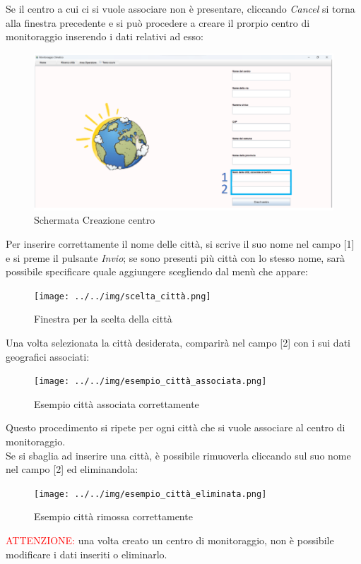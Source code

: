 Se il centro a cui ci si vuole associare non è presentare, cliccando \emph{Cancel} si torna alla finestra precedente e si può procedere a creare il prorpio
centro di monitoraggio inserendo i dati relativi ad esso:
\begin{figure}[H]
    \centering
    \includegraphics[width=1\textwidth]{../../img/schermata_creazione_centro.png}
    \caption{Schermata Creazione centro}
\end{figure}

Per inserire correttamente il nome delle città, si scrive il suo nome nel campo [1] e si preme il pulsante \emph{Invio}; se sono presenti più città
con lo stesso nome,
sarà possibile specificare quale aggiungere scegliendo dal menù che appare: 
\begin{figure}[H]
    \centering
    \texttt{[image: ../../img/scelta\_città.png]}
    \caption{Finestra per la scelta della città}
\end{figure}

Una volta selezionata la città desiderata, comparirà nel campo [2] con i sui dati geografici associati:
\begin{figure}[H]
    \centering
    \texttt{[image: ../../img/esempio\_città\_associata.png]}
    \caption{Esempio città associata correttamente}
\end{figure}

Questo procedimento si ripete per ogni città che si vuole associare al centro di monitoraggio.\\
Se si sbaglia ad inserire una città, è possibile rimuoverla cliccando sul suo nome nel campo [2] ed eliminandola:
\begin{figure}[H]
    \centering
    \texttt{[image: ../../img/esempio\_città\_eliminata.png]}
    \caption{Esempio città rimossa correttamente}
\end{figure}

\textcolor{red}{ATTENZIONE:} una volta creato un centro di monitoraggio, non è possibile modificare i dati inseriti o eliminarlo.\\